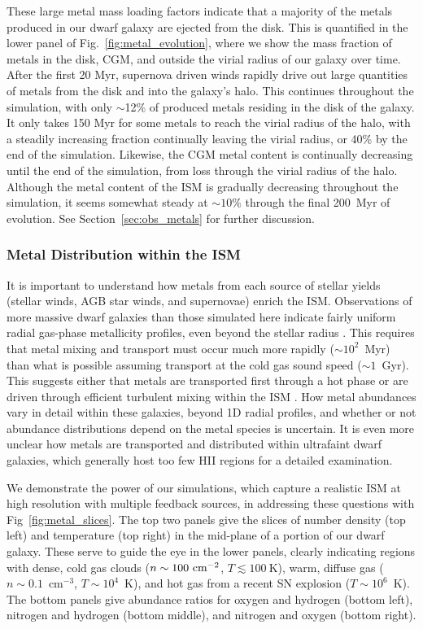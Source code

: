 \documentclass[twocolumn]{aastex61}
\begin{document}
These large metal mass loading factors indicate that a majority of the metals produced in our dwarf galaxy are ejected from the disk. This is quantified in the lower panel of Fig.~\ref{fig:metal_evolution}, where we show the mass fraction of metals in the disk, CGM, and outside the virial radius of our galaxy over time. After the first 20 Myr, supernova driven winds rapidly drive out large quantities of metals from the disk and into the galaxy's halo. This continues throughout the simulation, with only $\sim$12\% of produced metals residing in the disk of the galaxy. It only takes 150 Myr for some metals to reach the virial radius of the halo, with a steadily increasing fraction continually leaving the virial radius, or 40\% by the end of the simulation. Likewise, the CGM metal content is continually decreasing until the end of the simulation, from loss through the virial radius of the halo. Although the metal content of the ISM is gradually decreasing throughout the simulation, it seems somewhat steady at $\sim 10\%$ through the final 200~Myr of evolution. See Section~\ref{sec:obs_metals} for further discussion.

\subsubsection{Metal Distribution within the ISM}

It is important to understand how metals from each source of stellar yields (stellar winds, AGB star winds, and supernovae) enrich the ISM. Observations of more massive dwarf galaxies than those simulated here indicate fairly uniform radial gas-phase metallicity profiles, even beyond the stellar radius \citep[e.g.][]{Werk2011,Belfiore2017}. This requires that metal mixing and transport must occur much more rapidly ($\sim 10^2$~Myr) than what is possible assuming transport at the cold gas sound speed ($\sim 1$~Gyr). This suggests either that metals are transported first through a hot phase or are driven through efficient turbulent mixing within the ISM \citep[e.g.][]{Tassis2008,YangKrumholz2012}. How metal abundances vary in detail within these galaxies, beyond 1D radial profiles, and whether or not abundance distributions depend on the metal species is uncertain. It is even more unclear how metals are transported and distributed within ultrafaint dwarf galaxies, which generally host too few HII regions for a detailed examination.

We demonstrate the power of our simulations, which capture a realistic ISM at high resolution with multiple feedback sources, in addressing these questions with Fig~\ref{fig:metal_slices}. The top two panels give the slices of number density (top left) and temperature (top right) in the mid-plane of a portion of our dwarf galaxy. These serve to guide the eye in the lower panels, clearly indicating regions with dense, cold gas clouds ($n \sim 100~\rm{cm}^{-2}$, $T \lesssim 100~$K), warm, diffuse gas ($n\sim 0.1$~cm$^{-3}$, $T\sim 10^{4}$~K), and hot gas from a recent SN explosion ($T\sim10^{6}$~K). The bottom panels give abundance ratios for oxygen and hydrogen (bottom left), nitrogen and hydrogen (bottom middle), and nitrogen and oxygen (bottom right). 
\end{document}
